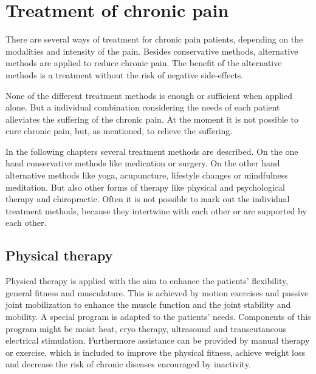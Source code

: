 

\section{Treatment of chronic pain}

There are several ways of treatment for chronic pain patients, depending on the modalities and intensity of the pain. Besides conservative methods, alternative methods are applied to reduce chronic pain. The benefit of the alternative methods is a treatment without the risk of negative side-effects. \cite{marcus2009,pope2017}

None of the different treatment methods is enough or sufficient when applied alone. But a individual combination considering the needs of each patient alleviates the suffering of the chronic pain.
At the moment it is not possible to cure chronic pain, but, as mentioned, to relieve the suffering. \cite{marcus2009,pope2017}

In the following chapters several treatment methods are described. On the one hand conservative methods like medication or surgery. On the other hand alternative methods like yoga, acupuncture, lifestyle changes or mindfulness meditation. But also other forms of therapy like physical and psychological therapy and chiropractic.
Often it is not possible to mark out the individual treatment methods, because they intertwine with each other or are supported by each other.

\subsection{Physical therapy}

Physical therapy is applied with the aim to enhance the patients' flexibility, general fitness and musculature. This is achieved by motion exercises and passive joint mobilization to enhance the muscle function and the joint stability and mobility. A special program is adapted to the patients' needs. Components of this program might be moist heat, cryo therapy, ultrasound and transcutaneous electrical stimulation. Furthermore assistance can be provided by manual therapy or exercise, which is included to improve the physical fitness, achieve weight loss and decrease the risk of chronic diseases encouraged by inactivity. \cite{marcus2009,pope2017}

